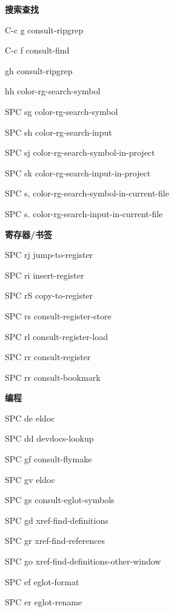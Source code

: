\documentclass[10pt]{article}
\renewcommand\section[1]{\bigskip\par\textbf{\color{heading}\large#1}\smallskip}
\renewcommand\subsection[1]{\smallskip\par\textbf{\color{heading}#1}}
\begin{document}
\begin{multicols}{4}
\begin{keylist}
  \subsection{搜索查找}
  \begin{keylist}
  \item[C-c g] consult-ripgrep
  \item[C-c f] consult-find
  \item[gh] consult-ripgrep
  \item[hh] color-rg-search-symbol
  \item[SPC sg] color-rg-search-symbol
  \item[SPC sh] color-rg-search-input
  \item[SPC sj] color-rg-search-symbol-in-project
  \item[SPC sk] color-rg-search-input-in-project
  \item[SPC s,] color-rg-search-symbol-in-current-file
  \item[SPC s.] color-rg-search-input-in-current-file
  \end{keylist}

  \subsection{寄存器/书签}
  \begin{keylist}
  \item[SPC rj] jump-to-register
  \item[SPC ri] insert-register
  \item[SPC rS] copy-to-register
  \item[SPC rs] consult-register-store
  \item[SPC rl] consult-register-load
  \item[SPC rr] consult-register
  \item[SPC rr] consult-bookmark
  \end{keylist}

  \section{编程}
  \begin{keylist}
  \end{keylist}
  \item[SPC de] eldoc
  \item[SPC dd] devdocs-lookup
  \item[SPC gf] consult-flymake
  \item[SPC gv] eldoc
  \item[SPC gs] consult-eglot-symbols
  \item[SPC gd] xref-find-definitions
  \item[SPC gr] xref-find-references
  \item[SPC go] xref-find-definitions-other-window
  \item[SPC ef] eglot-format
  \item[SPC er] eglot-rename


\end{keylist}
\end{multicols}
\end{document}
